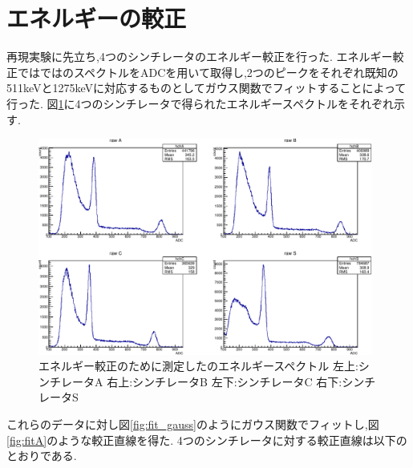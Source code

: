 \section{エネルギーの較正}\label{calibration}
再現実験に先立ち,4つのシンチレータのエネルギー較正を行った.
エネルギー較正ではではのスペクトルをADCを用いて取得し,2つのピークをそれぞれ既知の511keVと1275keVに対応するものとしてガウス関数でフィットすることによって行った.
図\ref{fig:calibration_raw_data}に4つのシンチレータで得られたエネルギースペクトルをそれぞれ示す.
\begin{figure}[H]
	\centering
		\includegraphics[width=11cm]{fig/isb/cal7001.pdf}
		\caption{エネルギー較正のために測定したのエネルギースペクトル \newline 左上:シンチレータA 右上:シンチレータB 左下:シンチレータC 右下:シンチレータS}
		\label{fig:calibration_raw_data}
\end{figure}
これらのデータに対し図\ref{fig:fit_gauss}のようにガウス関数でフィットし,図\ref{fig:fitA}のような較正直線を得た.
4つのシンチレータに対する較正直線は以下のとおりである.

